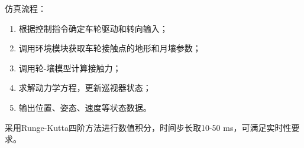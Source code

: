 仿真流程：
\begin{enumerate}
    \item 根据控制指令确定车轮驱动和转向输入；
    \item 调用环境模块获取车轮接触点的地形和月壤参数；
    \item 调用轮-壤模型计算接触力；
    \item 求解动力学方程，更新巡视器状态；
    \item 输出位置、姿态、速度等状态数据。
\end{enumerate}

采用Runge-Kutta四阶方法进行数值积分，时间步长取10-50 ms，可满足实时性要求。
